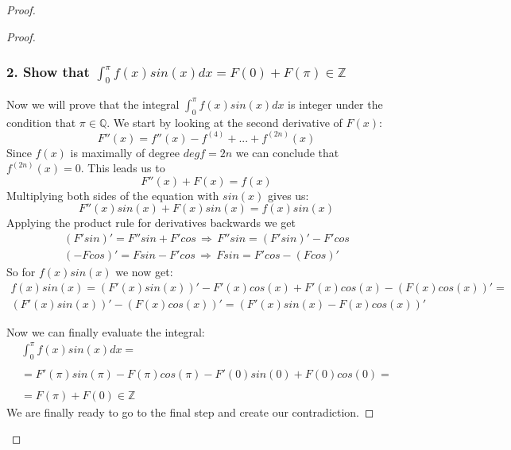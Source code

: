 \documentclass{article}
\theoremstyle{definition}
\begin{document}
\begin{proof}
\begin{proof}
\subsubsection*{ 2. Show that $\int_0^{\pi}f(x)sin(x)dx=F(0)+F(\pi)\in \mathbb{Z}$}

Now we will prove that the integral $\int_0^{\pi}f(x)sin(x)dx$ is integer under the condition that $\pi \in \mathbb{Q}$. We start by looking at the second derivative of $F(x)$:
\begin{equation}
    F''(x) = f''(x) -  f^{(4)} +...+f^{(2n)}(x) 
\end{equation}
Since $f(x)$ is maximally of degree $deg f = 2n$ we can conclude that $f^{(2n)}(x)=0$. This leads us to 
\begin{equation}
    F''(x) + F(x) = f(x)
\end{equation}
Multiplying both sides of the equation with $sin(x)$ gives us:
\begin{equation}
    F''(x)sin(x) + F(x)sin(x) = f(x)sin(x)
\end{equation}
Applying the product rule for derivatives backwards we get
\begin{align*}
    (F'sin)' = F''sin + F'cos \, \Rightarrow \, F''sin = (F'sin)'-F'cos\\
    (-Fcos)' = Fsin -F'cos \, \Rightarrow \, Fsin = F'cos - (Fcos)'
\end{align*}
So for $f(x)sin(x)$ we now get:
\begin{align*}
    f(x)sin(x) = (F'(x)sin(x))' - F'(x)cos(x) + F'(x)cos(x)-(F(x)cos(x))'= \\
    (F'(x)sin(x))'- (F(x)cos(x))' = (F'(x)sin(x)-F(x)cos(x))'
\end{align*}

Now we can finally evaluate the integral:
\begin{align*}
    \int_0^{\pi}f(x)sin(x)dx = \\ \\
    = F'(\pi)sin(\pi) - F(\pi)cos(\pi) - F'(0)sin(0) + F(0)cos(0) = \\
    \\ =  F(\pi) + F(0) \in \mathbb{Z}
\end{align*}
We are finally ready to go to the final step and create our contradiction.

\end{proof}
\end{proof}
\end{document}
